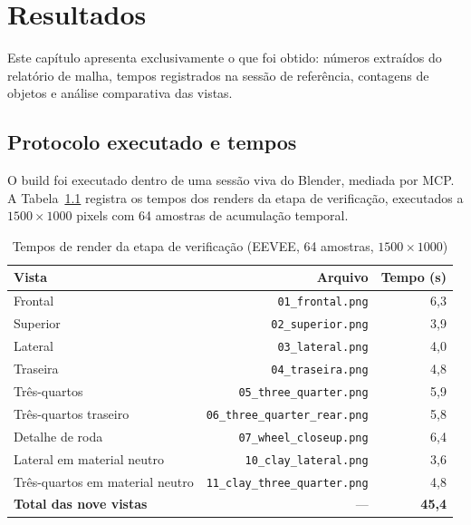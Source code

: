\chapter{Resultados}\label{ch:resultados}

Este cap\'itulo apresenta exclusivamente o que foi obtido: n\'umeros extra\'idos do
relat\'orio de malha, tempos registrados na sess\~ao de refer\^encia, contagens de objetos e
an\'alise comparativa das vistas.

\section{Protocolo executado e tempos}

O build foi executado dentro de uma sess\~ao viva do Blender, mediada por MCP. A
Tabela~\ref{tab:tempos} registra os tempos dos renders da etapa de verifica{\c{c}}\~ao,
executados a $1500 \times 1000$ pixels com 64 amostras de acumula{\c{c}}\~ao temporal.

\begin{table}[htbp]
\centering
\caption{Tempos de render da etapa de verifica{\c{c}}\~ao (EEVEE, 64 amostras,
         $1500\times1000$)}
\label{tab:tempos}
\footnotesize
\begin{tabular}{>{\raggedright\arraybackslash}p{5.4cm}rr}
\toprule
\textbf{Vista} & \textbf{Arquivo} & \textbf{Tempo (s)} \\
\midrule
Frontal & \texttt{01\_frontal.png} & 6,3 \\
Superior & \texttt{02\_superior.png} & 3,9 \\
Lateral & \texttt{03\_lateral.png} & 4,0 \\
Traseira & \texttt{04\_traseira.png} & 4,8 \\
Tr\^es-quartos & \texttt{05\_three\_quarter.png} & 5,9 \\
Tr\^es-quartos traseiro & \texttt{06\_three\_quarter\_rear.png} & 5,8 \\
Detalhe de roda & \texttt{07\_wheel\_closeup.png} & 6,4 \\
Lateral em material neutro & \texttt{10\_clay\_lateral.png} & 3,6 \\
Tr\^es-quartos em material neutro & \texttt{11\_clay\_three\_quarter.png} & 4,8 \\
\midrule
\textbf{Total das nove vistas} & --- & \textbf{45,4} \\
\bottomrule
\end{tabular}
\end{table}

